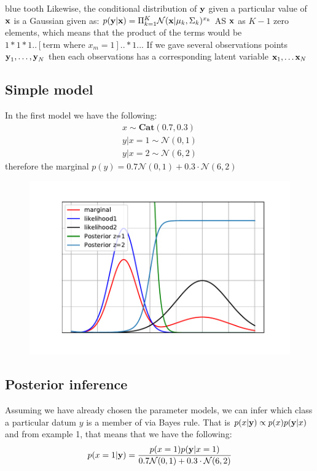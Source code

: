 blue tooth
Likewise, the conditional distribution of $\textbf{y}$ given a particular value of $\textbf{x}$ is a Gaussian given as:
$p(\textbf{y}|\textbf{x}) = \Pi_{k=1}^{K}\mathcal{N}(\textbf{x} | \boldmath{\mu}_{k}, \boldmath{\Sigma}_{k})^{x_{k}}$
AS $\textbf{x}$ as $K-1$ zero elements, which means that the product of the terms would be $1*1*1..[\text{term where } x_{m} = 1]..*1..$. If we gave several observations points $\textbf{y}_{1}, \dots, \textbf{y}_{N}$ then each observations has a corresponding latent variable $\textbf{x}_{1}, \ldots \textbf{x}_{N}$
\subsection{Simple model}
In the first model we have the following:
\begin{align}
x \sim \textbf{Cat}(0.7,0.3) \\
y | x = 1 \sim \mathcal{N}(0,1) \\
y | x = 2 \sim \mathcal{N}(6,2)
\end{align}
therefore the marginal $p(y) = 0.7\mathcal{N}(0,1) + 0.3\cdot \mathcal{N}(6,2)$

\begin{figure}[h!]
	\includegraphics{code/example1.pdf}
\end{figure}

\subsection{Posterior inference}
Assuming we have already chosen the parameter models, we can infer which class a particular datum $y$ is a member of  via Bayes rule. That is $p(x|\textbf{y}) \propto p(x)p(\textbf{y}|x)$ and from example 1, that means that we have the following: \begin{align}
p(x=1|\textbf{y}) =  \frac{p(x=1)p(\textbf{y}|x=1)}{0.7\mathcal{N}(0,1) + 0.3\cdot \mathcal{N}(6,2)}
\end{align}

